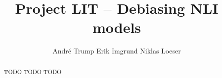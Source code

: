 \documentclass[11pt]{article}
\title{Project LIT -- Debiasing \acs{NLI} models}
\author{André Trump \And
  Erik Imgrund \And
  Niklas Loeser }
\begin{document}


\maketitle
\begin{abstract}
TODO TODO TODO
\end{abstract}







\FloatBarrier



\FloatBarrier
\appendix

\end{document}
